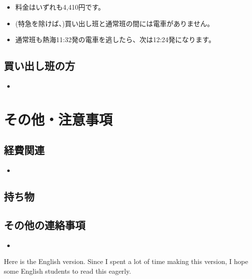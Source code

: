 \documentclass[unicode,a4paper,11pt]{ltjsarticle}
\begin{document}
\begin{itemize}
  \item
        料金はいずれも4,410円です。
  \item
        (特急を除けば、)買い出し班と通常班の間には電車がありません。
  \item
        通常班も熱海11:32発の電車を逃したら、次は12:24発になります。
\end{itemize}

\subsection*{買い出し班の方}

\begin{itemize}
  \item 


\end{itemize}

\section{その他・注意事項}

\subsection{経費関連}

\begin{itemize}
  \item 
  
\end{itemize}

\subsection{持ち物}


\subsection{その他の連絡事項}
\begin{itemize}
  \item 

  
\end{itemize}



\clearpage

\setcounter{section}{0}

Here is the English version. Since I spent a lot of time making this version, I hope some English students to read this eagerly.
\end{document}
